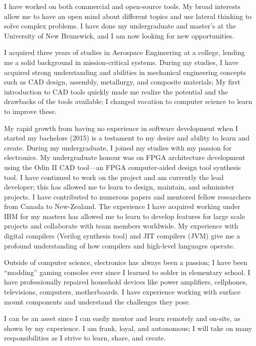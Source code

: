 I have worked on both commercial and open-source tools.
My broad interests allow me to have an open mind about different topics and use lateral thinking to solve complex problems.
I have done my undergraduate and master's at the University of New Brunswick, and I am now looking for new opportunities.

I acquired three years of studies in Aerospace Engineering at a college, lending me a solid background in mission-critical systems.
During my studies, I have acquired strong understanding and abilities in mechanical engineering concepts such as CAD design, assembly, metallurgy, and composite materials;
My first introduction to CAD tools quickly made me realize the potential and the drawbacks of the tools available; I changed vocation to computer science to learn to improve these.

My rapid growth from having no experience in software development when I started my bachelors (2015) is a testament to my desire and ability to learn and create.
During my undergraduate, I joined my studies with my passion for electronics. My undergraduate honour was on FPGA architecture development using the Odin II CAD tool---an FPGA computer-aided design tool synthesis tool.
I have continued to work on the project and am currently the lead developer; this has allowed me to learn to design, maintain, and administer projects.
I have contributed to numerous papers and mentored fellow researchers from Canada to New-Zealand.
The experience I have acquired working under IBM for my masters has allowed me to learn to develop features for large scale projects and collaborate with team members worldwide.
My experience with digital compilers (Verilog synthesis tool) and JIT compilers (JVM) give me a profound understanding of how compilers and high-level languages operate.

Outside of computer science, electronics has always been a passion; I have been ``modding'' gaming consoles ever since I learned to solder in elementary school.
I have professionally repaired household devices like power amplifiers, cellphones, televisions, computers, motherboards.
I have experience working with surface mount components and understand the challenges they pose.

I can be an asset since I can easily mentor and learn remotely and on-site, as shown by my experience.
I am frank, loyal, and autonomous; I will take on many responsibilities as I strive to learn, share, and create.
